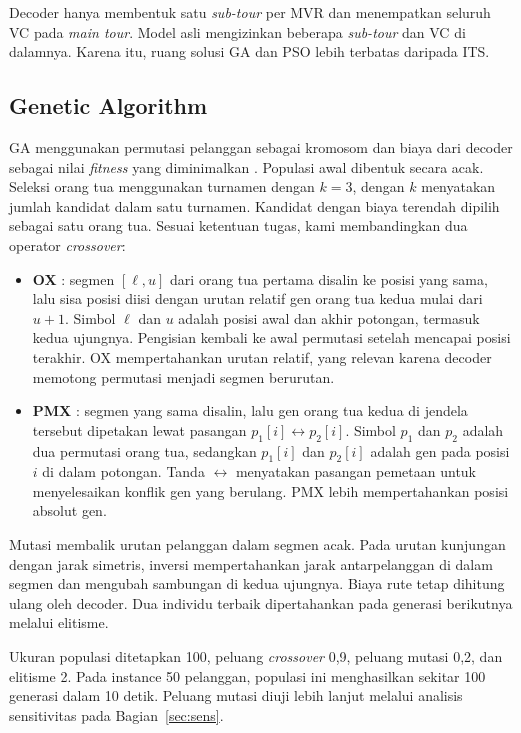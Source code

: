 \documentclass[conference]{IEEEtran}
\begin{document}
Decoder hanya membentuk satu \textit{sub-tour} per MVR dan menempatkan seluruh VC pada \textit{main tour}. Model asli mengizinkan beberapa \textit{sub-tour} dan VC di dalamnya. Karena itu, ruang solusi GA dan PSO lebih terbatas daripada ITS.

\subsection{Genetic Algorithm}

GA menggunakan permutasi pelanggan sebagai kromosom dan biaya dari decoder sebagai nilai \textit{fitness} yang diminimalkan \cite{prins2004}. Populasi awal dibentuk secara acak. Seleksi orang tua menggunakan turnamen dengan $k=3$, dengan $k$ menyatakan jumlah kandidat dalam satu turnamen. Kandidat dengan biaya terendah dipilih sebagai satu orang tua. Sesuai ketentuan tugas, kami membandingkan dua operator \textit{crossover}:
\begin{itemize}
\item \textbf{OX} \cite{davis1985}: segmen $[\ell,u]$ dari orang tua pertama disalin ke posisi yang sama, lalu sisa posisi diisi dengan urutan relatif gen orang tua kedua mulai dari $u+1$. Simbol $\ell$ dan $u$ adalah posisi awal dan akhir potongan, termasuk kedua ujungnya. Pengisian kembali ke awal permutasi setelah mencapai posisi terakhir. OX mempertahankan urutan relatif, yang relevan karena decoder memotong permutasi menjadi segmen berurutan.
\item \textbf{PMX} \cite{goldberg1985}: segmen yang sama disalin, lalu gen orang tua kedua di jendela tersebut dipetakan lewat pasangan $p_1[i]\leftrightarrow p_2[i]$. Simbol $p_1$ dan $p_2$ adalah dua permutasi orang tua, sedangkan $p_1[i]$ dan $p_2[i]$ adalah gen pada posisi $i$ di dalam potongan. Tanda $\leftrightarrow$ menyatakan pasangan pemetaan untuk menyelesaikan konflik gen yang berulang. PMX lebih mempertahankan posisi absolut gen.
\end{itemize}
Mutasi membalik urutan pelanggan dalam segmen acak. Pada urutan kunjungan dengan jarak simetris, inversi mempertahankan jarak antarpelanggan di dalam segmen dan mengubah sambungan di kedua ujungnya. Biaya rute tetap dihitung ulang oleh decoder. Dua individu terbaik dipertahankan pada generasi berikutnya melalui elitisme.

Ukuran populasi ditetapkan 100, peluang \textit{crossover} 0,9, peluang mutasi 0,2, dan elitisme 2. Pada instance 50 pelanggan, populasi ini menghasilkan sekitar 100 generasi dalam 10 detik. Peluang mutasi diuji lebih lanjut melalui analisis sensitivitas pada Bagian~\ref{sec:sens}.
\end{document}
